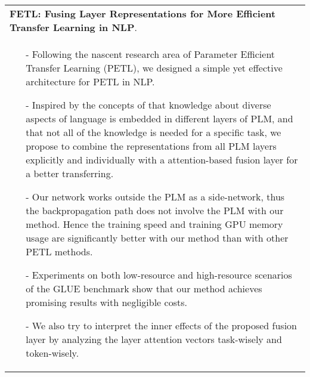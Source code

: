 \documentclass[a4paper,12pt]{article}
\newcommand{\signed}[1]{%
\unskip\nobreak\hfil\penalty50
   \hskip2em\hbox{}\nobreak\hfil#1
   \parfillskip=0pt \finalhyphendemerits=0 }
\begin{document}
\begin{CJK*}{UTF8}{gbsn}
\begin{tabularx}{\linewidth}{ @{}X@{} }
\textbf{FETL: Fusing Layer Representations for More Efficient Transfer Learning in NLP}. \signed{\textit{zhuwenq}. under review.}\\[3.75pt]
\begin{minipage}[t]{\linewidth}
    \begin{itemize}[nosep,after=\strut, leftmargin=1em, itemsep=3pt]
        \item[-] Following the nascent research area of Parameter Efficient Transfer Learning (PETL),
        we designed a simple yet effective architecture for PETL in NLP.
        \item[-] Inspired by the concepts of that knowledge about diverse aspects of language is embedded
        in different layers of PLM, and that not all of the knowledge is needed for a specific task,
        we propose to combine the representations from all PLM layers explicitly and individually
        with a attention-based fusion layer for a better transferring.
        \item[-] Our network works outside the PLM as a side-network, thus the backpropagation
        path does not involve the PLM with our method. Hence the training speed and training GPU
        memory usage are significantly better with our method than with other PETL methods.
        \item[-] Experiments on both low-resource and high-resource scenarios of the GLUE benchmark
        show that our method achieves promising results with negligible costs.
        \item[-] We also try to interpret the inner effects of the proposed fusion layer by analyzing
        the layer attention vectors task-wisely and token-wisely.
    \end{itemize}
    \end{minipage}
\end{tabularx}



\end{CJK*}
\end{document}
